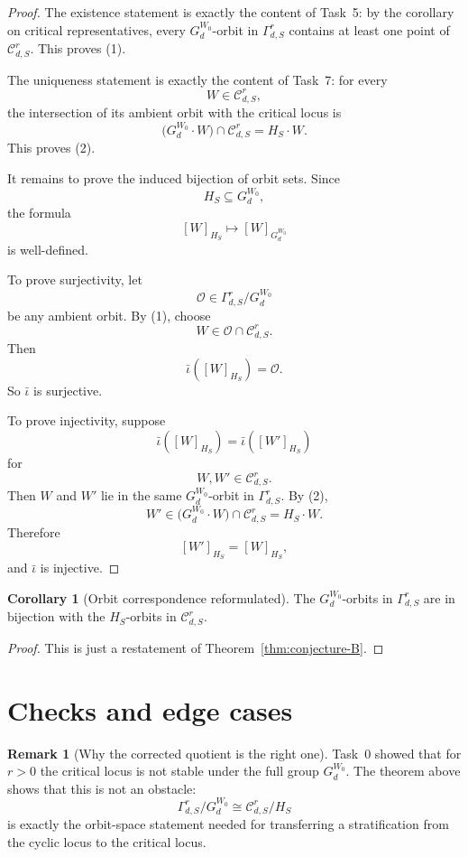 \documentclass{article}
\theoremstyle{definition}
\newtheorem{corollary}[theorem]{Corollary}
\newtheorem{remark}[theorem]{Remark}
\begin{document}
\begin{proof}
The existence statement is exactly the content of Task~5: by the corollary on
critical representatives, every $G_d^{W_0}$-orbit in $\Gamma_{d,S}^r$ contains
at least one point of $\mathcal C_{d,S}^r$. This proves (1).

The uniqueness statement is exactly the content of Task~7: for every
\[
W\in \mathcal C_{d,S}^r,
\]
the intersection of its ambient orbit with the critical locus is
\[
\bigl(G_d^{W_0}\cdot W\bigr)\cap \mathcal C_{d,S}^r
=
H_S\cdot W.
\]
This proves (2).

It remains to prove the induced bijection of orbit sets. Since
\[
H_S\subseteq G_d^{W_0},
\]
the formula
\[
[W]_{H_S}\mapsto [W]_{G_d^{W_0}}
\]
is well-defined.

To prove surjectivity, let
\[
\mathcal O\in \Gamma_{d,S}^r/G_d^{W_0}
\]
be any ambient orbit. By (1), choose
\[
W\in \mathcal O\cap \mathcal C_{d,S}^r.
\]
Then
\[
\bar\iota([W]_{H_S})=\mathcal O.
\]
So $\bar\iota$ is surjective.

To prove injectivity, suppose
\[
\bar\iota([W]_{H_S})=\bar\iota([W']_{H_S})
\]
for
\[
W,W'\in \mathcal C_{d,S}^r.
\]
Then $W$ and $W'$ lie in the same $G_d^{W_0}$-orbit in $\Gamma_{d,S}^r$. By
(2),
\[
W'\in \bigl(G_d^{W_0}\cdot W\bigr)\cap \mathcal C_{d,S}^r
=
H_S\cdot W.
\]
Therefore
\[
[W']_{H_S}=[W]_{H_S},
\]
and $\bar\iota$ is injective.
\end{proof}

\begin{corollary}[Orbit correspondence reformulated]
The $G_d^{W_0}$-orbits in $\Gamma_{d,S}^r$ are in bijection with the
$H_S$-orbits in $\mathcal C_{d,S}^r$.
\end{corollary}

\begin{proof}
This is just a restatement of Theorem~\ref{thm:conjecture-B}.
\end{proof}

\section{Checks and edge cases}

\begin{remark}[Why the corrected quotient is the right one]
Task~0 showed that for $r>0$ the critical locus is not stable under the full
group $G_d^{W_0}$. The theorem above shows that this is not an obstacle:
\[
\Gamma_{d,S}^r/G_d^{W_0}
\cong
\mathcal C_{d,S}^r/H_S
\]
is exactly the orbit-space statement needed for transferring a stratification
from the cyclic locus to the critical locus.
\end{remark}
\end{document}
